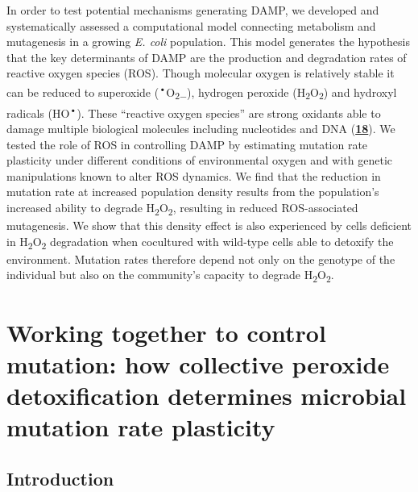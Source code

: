 \documentclass[
  12pt,
  letterpaper,
  DIV=11,
  numbers=noendperiod]{scrreprt}
\begin{document}
In order to test potential mechanisms generating DAMP, we developed and
systematically assessed a computational model connecting metabolism and
mutagenesis in a growing \emph{E. coli} population. This model generates
the hypothesis that the key determinants of DAMP are the production and
degradation rates of reactive oxygen species (ROS). Though molecular
oxygen is relatively stable it can be reduced to superoxide
(\textsuperscript{•}O\textsubscript{2−}), hydrogen peroxide
(H\textsubscript{2}O\textsubscript{2}) and hydroxyl radicals
(HO\textsuperscript{•}). These ``reactive oxygen species'' are strong
oxidants able to damage multiple biological molecules including
nucleotides and DNA
(\href{https://www.biorxiv.org/content/10.1101/2023.09.27.557722v1.full\#ref-18}{\textbf{18}}).
We tested the role of ROS in controlling DAMP by estimating mutation
rate plasticity under different conditions of environmental oxygen and
with genetic manipulations known to alter ROS dynamics. We find that the
reduction in mutation rate at increased population density results from
the population's increased ability to degrade
H\textsubscript{2}O\textsubscript{2}, resulting in reduced
ROS-associated mutagenesis. We show that this density effect is also
experienced by cells deficient in H\textsubscript{2}O\textsubscript{2}
degradation when cocultured with wild-type cells able to detoxify the
environment. Mutation rates therefore depend not only on the genotype of
the individual but also on the community's capacity to degrade
H\textsubscript{2}O\textsubscript{2}.


\hypertarget{working-together-to-control-mutation-how-collective-peroxide-detoxification-determines-microbial-mutation-rate-plasticity}{%
\chapter{Working together to control mutation: how collective peroxide
detoxification determines microbial mutation rate
plasticity}\label{working-together-to-control-mutation-how-collective-peroxide-detoxification-determines-microbial-mutation-rate-plasticity}}

\hypertarget{introduction-1}{%
\section{Introduction}\label{introduction-1}}
\end{document}
